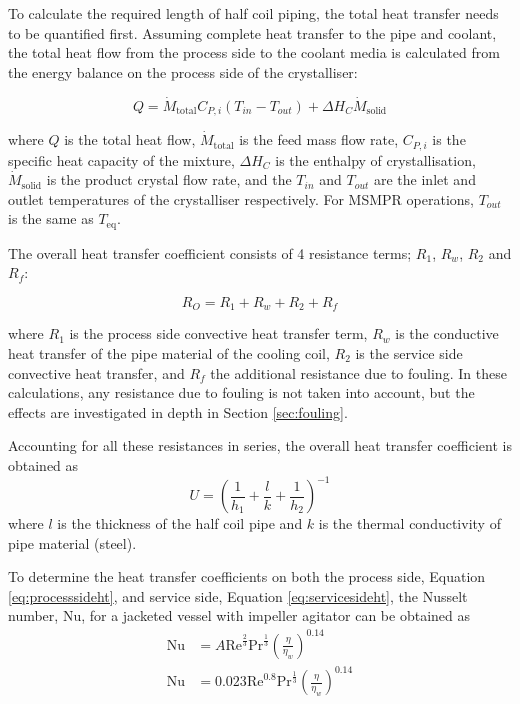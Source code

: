To calculate the required length of half coil piping, the total heat transfer needs to be quantified first. Assuming complete heat transfer to the pipe and coolant, the total heat flow from the process side to the coolant media is calculated from the energy balance on the process side of the crystalliser:

\begin{equation} \label{eq:energy balance}
    Q =  \dot{M}_{\mathrm{total}} C_{P,i} (T_{in}-T_{out}) + \Delta H_{C} \dot{M}_{\mathrm{solid}}
\end{equation}

\noindent where $Q$ is the total heat flow, $\dot{M}_{\mathrm{total}}$ is the feed mass flow rate, $C_{P,i}$ is the specific heat capacity of the mixture, $\Delta H_{C}$ is the enthalpy of crystallisation, $\dot{M}_{\mathrm{solid}}$ is the product crystal flow rate, and the $T_{in}$ and $T_{out}$ are the inlet and outlet temperatures of the crystalliser respectively. For MSMPR operations, $T_{out}$ is the same as $T_{\mathrm{eq}}$. 


The overall heat transfer coefficient consists of 4 resistance terms; $R_1$, $R_w$, $R_2$ and $R_f$:

\begin{equation} \label{eq:resistht}
    R_O = R_1 + R_w + R_2 + R_f
\end{equation}

\noindent where $R_1$ is the process side convective heat transfer term, $R_w$ is the conductive heat transfer of the pipe material of the cooling coil, $R_2$ is the service side convective heat transfer, and $R_f$ the additional resistance due to fouling. In these calculations, any resistance due to fouling is not taken into account, but the effects are investigated in depth in Section \ref{sec:fouling}. 

Accounting for all these resistances in series, the overall heat transfer coefficient is obtained as 
\begin{equation} \label{eq:energy balance}
    U = \left(\frac{1}{h_1} + \frac{l}{k}   + \frac{1}{h_2 } \right)^{-1}
\end{equation}
where $l$ is the thickness of the half coil pipe and $k$ is the thermal conductivity of pipe material (steel).

To determine the heat transfer coefficients on both the process side, Equation \ref{eq:processsideht}, and service side, Equation \ref{eq:servicesideht}, the Nusselt number, $\mathrm{Nu}$, for a jacketed vessel with impeller agitator can be obtained as \cite{thermopedia}
\begin{align} 
    \mathrm{Nu} &= A\mathrm{Re}^{\frac{2}{3}}\mathrm{Pr}^{\frac{1}{3}}\left( \frac{\eta}{\eta_w} \right)^{0.14} \label{eq:processsideht} \\
    \mathrm{Nu} &= 0.023\mathrm{Re}^{0.8}\mathrm{Pr}^{\frac{1}{3}} \left( \frac{\eta}{\eta_w} \right)^{0.14} \label{eq:servicesideht}
\end{align}

